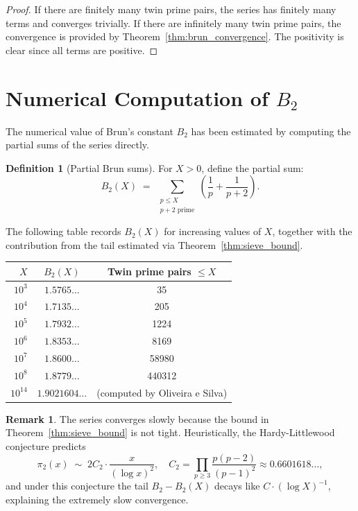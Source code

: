 \documentclass[12pt,a4paper]{amsart}
\theoremstyle{definition}
\newtheorem{definition}[theorem]{Definition}
\newtheorem{remark}[theorem]{Remark}
\begin{document}
\begin{proof}
  If there are finitely many twin prime pairs, the series has finitely many
  terms and converges trivially.  If there are infinitely many twin prime
  pairs, the convergence is provided by Theorem~\ref{thm:brun_convergence}.
  The positivity is clear since all terms are positive.
\end{proof}

\section{Numerical Computation of \texorpdfstring{$B_2$}{B2}}
\label{sec:numerical}

The numerical value of Brun's constant $B_2$ has been estimated by
computing the partial sums of the series directly.

\begin{definition}[Partial Brun sums]
  For $X > 0$, define the partial sum:
  \[
    B_2(X) \;=\; \sum_{\substack{p \leq X \\ p+2\text{ prime}}}
                  \left(\frac{1}{p} + \frac{1}{p+2}\right).
  \]
\end{definition}

The following table records $B_2(X)$ for increasing values of $X$,
together with the contribution from the tail estimated via
Theorem~\ref{thm:sieve_bound}.

\begin{center}
\begin{tabular}{rcc}
\toprule
$X$ & $B_2(X)$ & Twin prime pairs $\leq X$ \\
\midrule
$10^3$   & $1.5765\ldots$  & 35  \\
$10^4$   & $1.7135\ldots$  & 205 \\
$10^5$   & $1.7932\ldots$  & 1224 \\
$10^6$   & $1.8353\ldots$  & 8169 \\
$10^7$   & $1.8600\ldots$  & 58980 \\
$10^8$   & $1.8779\ldots$  & 440312 \\
$10^{14}$ & $1.9021604\ldots$ & (computed by Oliveira e Silva) \\
\bottomrule
\end{tabular}
\end{center}

\begin{remark}
  The series converges slowly because the bound in Theorem~\ref{thm:sieve_bound}
  is not tight.  Heuristically, the Hardy-Littlewood conjecture predicts
  \[
    \pi_2(x) \;\sim\; 2C_2 \cdot \frac{x}{(\log x)^2},
    \quad
    C_2 = \prod_{p \geq 3} \frac{p(p-2)}{(p-1)^2} \approx 0.6601618\ldots,
  \]
  and under this conjecture the tail $B_2 - B_2(X)$ decays like
  $C \cdot (\log X)^{-1}$, explaining the extremely slow convergence.
\end{remark}
\end{document}
